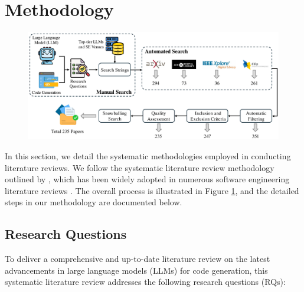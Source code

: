 \section{Methodology}\label{sec:methodology}
\begin{figure}[t]
\centering
\includegraphics[width=1\linewidth]{images/paper_search_collect_process.pdf}
\caption{}
\label{fig:review_process}
\end{figure}

In this section, we detail the systematic methodologies employed in conducting literature reviews. We follow the systematic literature review methodology outlined by \cite{kitchenham2009systematic}, which has been widely adopted in numerous software engineering literature reviews \cite{hou2024large,li2017static,liu2022deep,ramirez2018systematic,wang2022machine}. 
The overall process is illustrated in Figure \ref{fig:review_process}, and the detailed steps in our methodology are documented below.

\subsection{Research Questions}
To deliver a comprehensive and up-to-date literature review on the latest advancements in large language models (LLMs) for code generation, this systematic literature review addresses the following research questions (RQs):

